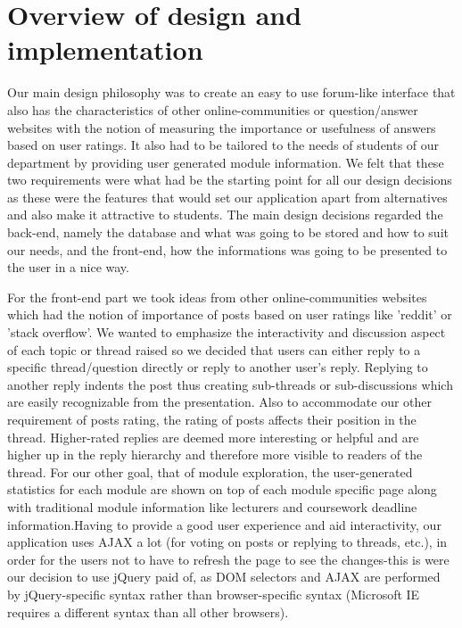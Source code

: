 \documentclass[12pt,a4paper,titlepage]{article}
\begin{document}
\section{Overview of design and implementation}
Our main design philosophy was to create an easy to use forum-like interface that also has the characteristics of other online-communities or question/answer websites with the notion of measuring the importance or usefulness of answers based on user ratings. It also had to be tailored to the needs of students of our department by providing user generated module information. We felt that these two requirements were what had be the starting point for all our design decisions as these were the features that would set our application apart from alternatives and also make it attractive to students. The main design decisions regarded the back-end, namely the database and what was going to be stored and how to suit our needs, and the front-end, how the informations was going to be presented to the user in a nice way.

For the front-end part we took ideas from other online-communities websites which had the notion of importance of posts based on user ratings like 'reddit' or 'stack overflow'.  We wanted to emphasize the interactivity and discussion aspect of each topic or thread raised so we decided that users can either reply to a specific thread/question directly or reply to another user's reply. Replying to another reply indents the post thus creating sub-threads or sub-discussions which are easily recognizable from the presentation. Also to accommodate our other requirement of posts rating, the rating of posts affects their position in the thread. Higher-rated replies are deemed more interesting or helpful and are higher up in the reply hierarchy and therefore more visible to readers of the thread. For our other goal, that of module exploration, the user-generated statistics for each module are shown on top of each module specific page along with traditional module information like lecturers and coursework deadline information.Having to provide a good user experience and aid interactivity, our application uses AJAX a lot (for voting on posts or replying to threads, etc.), in order for the users not to have to refresh the page to see the changes-this is were our decision to use jQuery paid of, as DOM selectors and AJAX are performed by jQuery-specific syntax rather than browser-specific syntax (Microsoft IE requires a different syntax than all other browsers).\\
\end{document}

